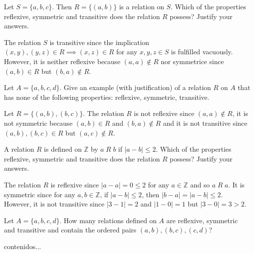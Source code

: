 \documentclass[12pt]{article}
\newcommand{\Z}{\mathbb{Z}}
\newenvironment{problem}[2][Problem]{\begin{trivlist}
		\item[\hskip \labelsep {\bfseries #1}\hskip \labelsep {\bfseries #2.}]}{\end{trivlist}}
\newenvironment{solution}[2][Solution]{\begin{trivlist}
		\item[\hskip \labelsep {\bfseries #1}\hskip \labelsep {\bfseries #2.}]}{\end{trivlist}}
\begin{document}
 	\begin{problem}{13}
 		Let $S=\{a,b,c\}$. Then $R=\{(a,b)\}$ is a relation on $S$. Which of the properties reflexive, symmetric and transitive does the relation $R$ possess? Justify your answers.
 		\begin{solution}{13}
 			The relation $S$ is transitive since the implication $(x,y),(y,z)\in R \implies (x,z)\in R$ for any $x,y,z\in S$ is fulfilled vacuously. However, it is neither reflexive because $(a,a)\not\in R$ nor symmetrice since $(a,b)\in R$ but $(b,a)\not\in R$.
 		\end{solution}
 	\end{problem}
 
 	\begin{problem}{14}
 		Let $A=\{a,b,c,d\}$. Give an example (with justification) of a relation $R$ on $A$ that has none of the following properties: reflexive, symmetric, transitive.
 		\begin{solution}{14}
 			Let $R=\{(a,b),(b,c)\}$. The relation $R$ is not reflexive since $(a,a)\not\in R$, it is not symmetric because $(a,b) \in R$ and $(b,a)\not\in R$ and it is not transitive since $(a,b),(b,c)\in R$ but $(a,c)\not\in R$.
 		\end{solution}
 	\end{problem}
 
 	\begin{problem}{15}
 		A relation $R$ is defined on $\Z$ by $a \; R \; b$ if $|a-b|\leq 2$. Which of the properties reflexive, symmetric and transitive does the relation $R$ possess? Justify your answers.
 		\begin{solution}{15}
 			The relation $R$ is reflexive since $|a-a| = 0\leq 2$ for any $a\in \Z$ and so $a \; R \; a$. It is symmetric since for any $a,b\in \Z$, if $|a-b| \leq 2$, then $|b-a|=|a-b|\leq 2$. However, it is not transitive since $|3-1|=2$ and $|1-0|=1$ but $|3-0| = 3>2$.
 		\end{solution}
 	\end{problem} 
 
 	\begin{problem}{16}
 		Let $A=\{a,b,c,d\}$. How many relations defined on $A$ are reflexive, symmetric and transitive and contain the ordered pairs $(a,b),(b,c),(c,d)$?
 		\begin{solution}{16}
 			contenidos...
 		\end{solution}
 	\end{problem}
\end{document}
